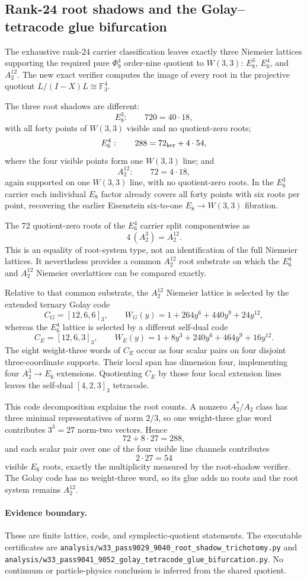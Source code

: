 \subsection*{Rank-24 root shadows and the Golay--tetracode glue bifurcation}

The exhaustive rank-$24$ carrier classification leaves exactly three Niemeier lattices
supporting the required pure $\Phi_9^4$ order-nine quotient to $W(3,3)$:
$E_8^3$, $E_6^4$, and $A_2^{12}$.  The new exact verifier computes the image of every
root in the projective quotient $L/(I-X)L\cong\mathbb F_3^4$.

The three root shadows are different:
\[
E_8^3:\qquad 720=40\cdot18,
\]
with all forty points of $W(3,3)$ visible and no quotient-zero roots;
\[
E_6^4:\qquad 288=72_{\rm ker}+4\cdot54,
\]
where the four visible points form one $W(3,3)$ line; and
\[
A_2^{12}:\qquad 72=4\cdot18,
\]
again supported on one $W(3,3)$ line, with no quotient-zero roots.  In the $E_8^3$
carrier each individual $E_8$ factor already covers all forty points with six roots per
point, recovering the earlier Eisenstein six-to-one $E_8\to W(3,3)$ fibration.

The $72$ quotient-zero roots of the $E_6^4$ carrier split componentwise as
\[
4\,(A_2^3)=A_2^{12}.
\]
This is an equality of root-system type, not an identification of the full Niemeier
lattices.  It nevertheless provides a common $A_2^{12}$ root substrate on which the
$E_6^4$ and $A_2^{12}$ Niemeier overlattices can be compared exactly.

Relative to that common substrate, the $A_2^{12}$ Niemeier lattice is selected by the
extended ternary Golay code
\[
C_G=[12,6,6]_3,
\qquad
W_G(y)=1+264y^6+440y^9+24y^{12},
\]
whereas the $E_6^4$ lattice is selected by a different self-dual code
\[
C_E=[12,6,3]_3,
\qquad
W_E(y)=1+8y^3+240y^6+464y^9+16y^{12}.
\]
The eight weight-three words of $C_E$ occur as four scalar pairs on four disjoint
three-coordinate supports.  Their local span has dimension four, implementing four
$A_2^3\to E_6$ extensions.  Quotienting $C_E$ by those four local extension lines leaves
the self-dual $[4,2,3]_3$ tetracode.

This code decomposition explains the root counts.  A nonzero $A_2^*/A_2$ class has three
minimal representatives of norm $2/3$, so one weight-three glue word contributes
$3^3=27$ norm-two vectors.  Hence
\[
72+8\cdot27=288,
\]
and each scalar pair over one of the four visible line channels contributes
\[
2\cdot27=54
\]
visible $E_6$ roots, exactly the multiplicity measured by the root-shadow verifier.
The Golay code has no weight-three word, so its glue adds no roots and the root system
remains $A_2^{12}$.

\paragraph{Evidence boundary.}
These are finite lattice, code, and symplectic-quotient statements.  The executable
certificates are
\texttt{analysis/w33\_pass9029\_9040\_root\_shadow\_trichotomy.py} and
\texttt{analysis/w33\_pass9041\_9052\_golay\_tetracode\_glue\_bifurcation.py}.
No continuum or particle-physics conclusion is inferred from the shared quotient.
